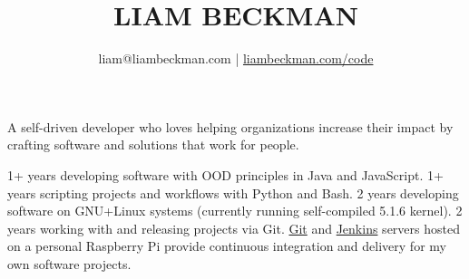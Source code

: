 


\title{\textcolor{my-red}{LIAM BECKMAN}}
\author{liam@liambeckman.com | \href{https://liambeckman.com/code}{liambeckman.com/code}}

\date{\vspace{-5ex}}



\maketitle

\begin{center}
A self-driven developer who loves helping organizations increase their impact by crafting software and solutions that work for people.
\end{center}





\vspace{-1em}
\begin{itemize}[label=$\triangleright$]
    1+ years developing software with OOD principles in Java and JavaScript.
    1+ years scripting projects and workflows with Python and Bash.
    2 years developing software on GNU+Linux systems (currently running self-compiled 5.1.6 kernel).
    2 years working with and releasing projects via Git. \textcolor{my-blue}{\href{https://git.liambeckman.com/}{Git}} and \textcolor{my-blue}{\href{https://liambeckman.com/jenkins/blue/organizations/jenkins/pipelines/}{Jenkins}} servers hosted on a personal Raspberry Pi provide continuous integration and delivery for my own software projects.
\end{itemize}

\medbreak









\vfill





